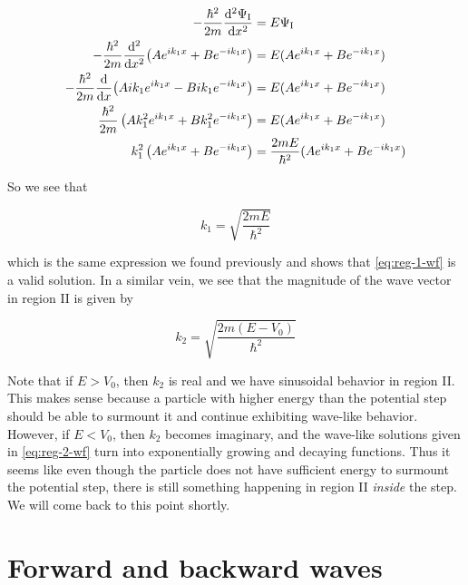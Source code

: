 \begin{align*}
	-\frac{\hbar^2}{2m} \dv[2]{\Psi_{\text{I}}}{x} &= E\Psi_{\text{I}} \\
	-\frac{\hbar^2}{2m} \dv[2]{x}(Ae^{ik_1x} + Be^{-ik_1x}) &= E(Ae^{ik_1x} + Be^{-ik_1x}) \\
	-\frac{\hbar^2}{2m} \dv{x}(Aik_1e^{ik_1x} - Bik_1e^{-ik_1x}) &= E(Ae^{ik_1x} + Be^{-ik_1x}) \\
	\frac{\hbar^2}{2m} \left(Ak_1^2e^{ik_1x} + Bk_1^2e^{-ik_1x}\right) &= E(Ae^{ik_1x} + Be^{-ik_1x}) \\
	k_1^2\left(Ae^{ik_1x} + Be^{-ik_1x}\right) &= \frac{2mE}{\hbar^2}(Ae^{ik_1x} + Be^{-ik_1x})
\end{align*}

So we see that

\begin{equation}
	k_1 = \sqrt{\frac{2mE}{\hbar^2}} \label{eq:reg-1-k}
\end{equation}

\noindent which is the same expression we found previously and shows that \autoref{eq:reg-1-wf} is a valid solution. 
In a similar vein, we see that the magnitude of the wave vector in region II is given by 

\begin{equation}
	k_2 = \sqrt{\frac{2m(E-V_0)}{\hbar^2}} \label{eq:reg-2-k}
\end{equation}

Note that if $E > V_0$, then $k_2$ is real and we have sinusoidal behavior in region II. 
This makes sense because a particle with higher energy than the potential step should be able to surmount it and continue exhibiting wave-like behavior. 
However, if $E < V_0$, then $k_2$ becomes imaginary, and the wave-like solutions given in \autoref{eq:reg-2-wf} turn into exponentially growing and decaying functions. 
Thus it seems like even though the particle does not have sufficient energy to surmount the potential step, there is still something happening in region II \emph{inside} the step. 
We will come back to this point shortly.


\section{Forward and backward waves}

